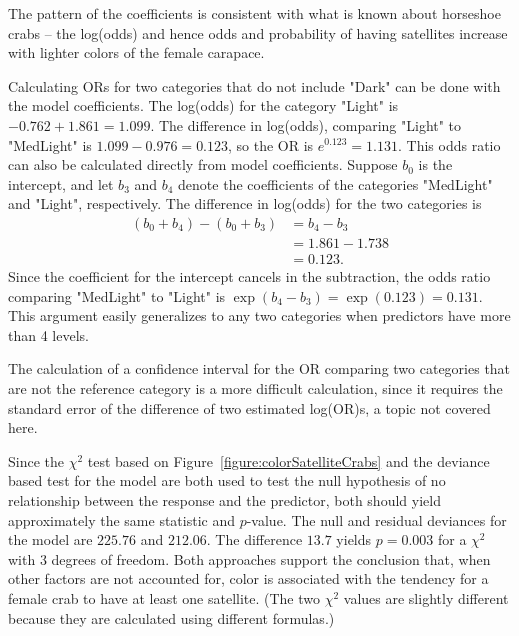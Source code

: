 
The pattern of the coefficients is consistent with what is known about horseshoe crabs -- the log(odds) and hence odds and probability of having satellites increase with lighter colors of the female carapace.

Calculating ORs for two categories that do not include "Dark" can be done with the model coefficients.  The log(odds) for the category "Light" is $-0.762 + 1.861 = 1.099$.  The difference in log(odds), comparing "Light" to "MedLight" is $1.099 - 0.976 = 0.123$, so the OR is $e^{0.123} = 1.131$.  This odds ratio can also be calculated directly from model coefficients.  Suppose $b_0$ is the intercept, and let $b_3$ and $b_4$ denote the coefficients of the categories "MedLight" and "Light", respectively.  The difference in log(odds) for the two categories is
\begin{align*}
   (b_0 + b_4) - (b_0 + b_3) &= b_4 - b_3 \\
      &= 1.861 - 1.738 \\
      &= 0.123.
\end{align*}
Since the coefficient for the intercept cancels in the subtraction, the odds ratio comparing "MedLight" to "Light" is $\exp(b_4 - b_3) = \exp(0.123) = 0.131$.  This argument easily generalizes to any two categories when predictors have more than 4 levels.

The calculation of a confidence interval for the OR comparing two categories that are not the reference category is a more difficult calculation, since it requires the standard error of the difference of two estimated log(OR)s, a topic not covered here.

Since the $\chi^2$ test based on Figure~\ref{figure:colorSatelliteCrabs} and the deviance based test for the model are both used to test the null hypothesis of no relationship between the response and the predictor, both should yield approximately the same statistic and $p$-value. The null and residual deviances for the model are $225.76$ and $212.06$.  The difference $13.7$ yields $p = 0.003$ for a $\chi^2$ with 3 degrees of freedom.  Both approaches support the conclusion that, when other factors are not accounted for, color is associated with the tendency for a female crab to have at least one satellite.  (The two $\chi^2$ values are slightly different because they are calculated using different formulas.)

